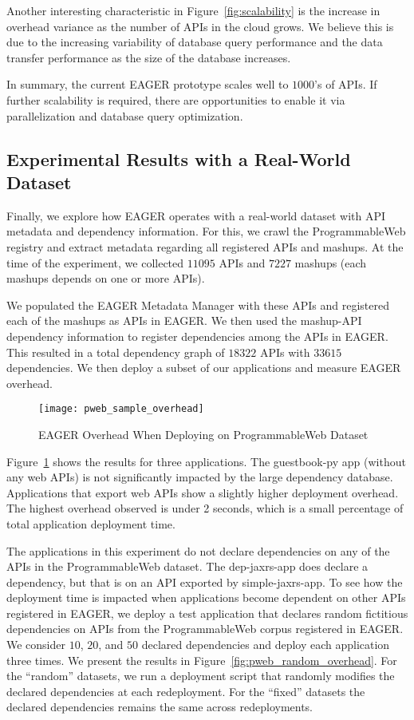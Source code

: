 Another interesting characteristic in Figure~\ref{fig:scalability} is the
increase in overhead variance as the number of APIs in the cloud
grows.  We believe this is due to the increasing variability of database query
performance and the data transfer performance as the size of the database
increases.

In summary, the current EAGER prototype scales well to $1000$'s of APIs.
If further scalability is required, there are opportunities to enable it
via parallelization and database query optimization.

\subsection{Experimental Results with a Real-World Dataset}

Finally, we explore how EAGER operates with a real-world dataset with API
metadata and dependency information. For this, we crawl the ProgrammableWeb
registry and extract metadata regarding all registered APIs and mashups.
At the time of the experiment, we collected $11095$ APIs and $7227$ 
mashups (each mashups depends on one or more APIs).

We populated the EAGER Metadata Manager with these APIs and
registered each of the mashups as APIs in EAGER. We then used the
mashup-API dependency information to register dependencies among the APIs in 
EAGER. This resulted in a total dependency graph of $18322$ APIs 
with $33615$ dependencies.  We then deploy a subset of our applications
and measure EAGER overhead.

\begin{figure}
\centering
\texttt{[image: pweb\_sample\_overhead]}
\caption{EAGER Overhead When Deploying on ProgrammableWeb Dataset}
\label{fig:pweb_sample_overhead}
\end{figure}

Figure~\ref{fig:pweb_sample_overhead} shows the results for three applications. The guestbook-py app
(without any web APIs) is not significantly impacted by the large dependency database. 
Applications that export web APIs show a slightly higher deployment overhead. 
The highest overhead observed is under 2 seconds, which is a small percentage
of total application deployment time. 

The applications in this experiment do not declare dependencies on any of the APIs 
in the ProgrammableWeb dataset. The dep-jaxrs-app does declare a dependency, 
but that is on an API exported by 
simple-jaxrs-app. To see how the deployment time is impacted
when applications become dependent on other APIs registered in EAGER, we
deploy a test application that declares random fictitious dependencies on APIs
from the ProgrammableWeb corpus registered in EAGER.  We consider 
$10$, $20$, and $50$ declared dependencies and deploy each
application three times.
We present the results in Figure~\ref{fig:pweb_random_overhead}.
For the ``random'' datasets, we
run a deployment script that randomly modifies the 
declared dependencies at each redeployment. For the 
``fixed'' datasets the declared dependencies remains the same across
redeployments.

